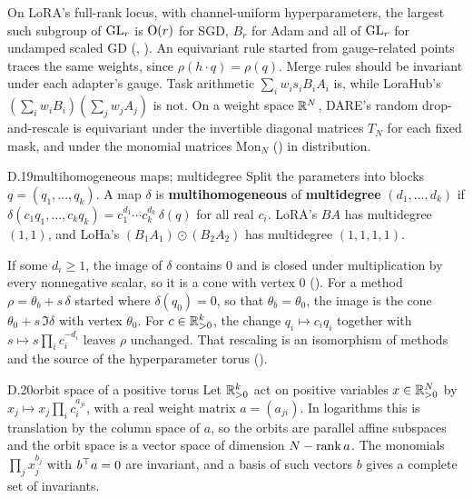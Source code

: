On LoRA's full-rank locus, with channel-uniform hyperparameters, the largest such subgroup of $\mathrm{GL}_r$ is $\mathrm{O}(r)$ for
SGD, $B_r$ for Adam and all of $\mathrm{GL}_r$ for undamped scaled GD (, ). An equivariant
rule started from gauge-related points traces the same weights, since $\rho(h\cdot q)=\rho(q)$. Merge rules should be
invariant under each adapter's gauge. Task arithmetic \citep{ilharco2022editing} $\sum_iw_is_iB_iA_i$ is, while
LoraHub's \citep{huang2023lorahub} $(\sum_iw_iB_i)(\sum_jw_jA_j)$ is not. On a weight space $\mathbb{R}^N$, DARE's
\citep{yu2023language} random drop-and-rescale is equivariant under the invertible diagonal matrices $T_N$ for each
fixed mask, and under the monomial matrices $\mathrm{Mon}_N$ () in distribution.


\begin{bgentry}{D.19}{multihomogeneous maps; multidegree}
Split the parameters into blocks $q=(q_1,\dots,q_k)$. A map $\delta$ is \textbf{multihomogeneous} of
\textbf{multidegree} $(d_1,\dots,d_k)$ if $\delta(c_1q_1,\dots,c_kq_k)=c_1^{d_1}\cdots c_k^{d_k}\,\delta(q)$ for all
real $c_i$. LoRA's $BA$ has multidegree $(1,1)$, and LoHa's $(B_1A_1)\odot(B_2A_2)$ has multidegree $(1,1,1,1)$.
\end{bgentry}

If some $d_i\ge1$, the image of $\delta$ contains $0$ and is closed under multiplication by every nonnegative scalar, so
it is a cone with vertex $0$ (). For a method $\rho=\theta_b+s\,\delta$ started where $\delta(q_0)=0$, so
that $\theta_b=\theta_0$, the image is the cone $\theta_0+s\,\Im\delta$ with vertex $\theta_0$. For $c\in\mathbb{R}^k_{>0}$, the
change $q_i\mapsto c_iq_i$ together with $s\mapsto s\prod_ic_i^{-d_i}$ leaves $\rho$ unchanged. That rescaling is an
isomorphism of methods and the source of the hyperparameter torus ().


\begin{bgentry}{D.20}{orbit space of a positive torus}
Let $\mathbb{R}^k_{>0}$ act on positive variables $x\in\mathbb{R}^N_{>0}$ by $x_j\mapsto x_j\prod_ic_i^{a_{ji}}$, with a real weight
matrix $a=(a_{ji})$. In logarithms this is translation by the column space of $a$, so the orbits are parallel affine
subspaces and the orbit space is a vector space of dimension $N-\operatorname{rank} a$. The monomials $\prod_jx_j^{b_j}$ with $b^{\top} a=0$
are invariant, and a basis of such vectors $b$ gives a complete set of invariants.
\end{bgentry}


